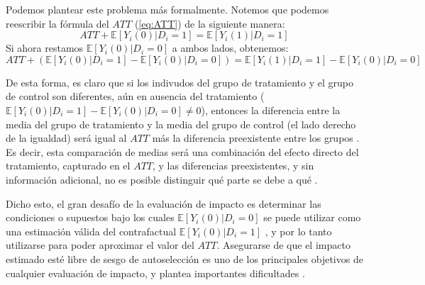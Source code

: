 \documentclass[../../main.tex]{subfiles}
\begin{document}
Podemos plantear este problema más formalmente. Notemos que podemos reescribir la fórmula
del \(ATT\) (\ref{eq:ATT}) de la siguiente manera:
\begin{equation}
    ATT + \mathbb{E} \left[Y_i(0)|D_i=1\right] = \mathbb{E} \left[Y_i(1)|D_i=1\right]
    \label{eq:ATT2}
\end{equation}
Si ahora restamos \(\mathbb{E} \left[Y_i(0)|D_i=0\right]\) a ambos lados, obtenemos:
\begin{equation}
    ATT + \left( \mathbb{E} \left[Y_i(0)|D_i=1\right] - \mathbb{E} \left[Y_i(0)|D_i=0\right] \right) =
    \mathbb{E} \left[Y_i(1)|D_i=1\right] - \mathbb{E} \left[Y_i(0)|D_i=0\right]\
    \label{eq:ATT3}
\end{equation}

De esta forma, es claro que si los indivudos del grupo de tratamiento y el grupo de
control son diferentes, aún en ausencia del tratamiento (\(\mathbb{E} \left[Y_i(0)|D_i=1\right] -
\mathbb{E} \left[Y_i(0)|D_i=0\right] \neq 0\)), entonces la diferencia entre la media del
grupo de tratamiento y la media del grupo de control (el lado derecho de la igualdad) será
igual al \(ATT\) más la diferencia preexistente entre los grupos \cite{bernal}. Es decir,
esta comparación de medias será una combinación del efecto directo del tratamiento,
capturado en el \(ATT\), y las diferencias preexistentes, y sin información adicional,
no es posible distinguir qué parte se debe a qué \cite{bernal}.

Dicho esto, el gran desafío de la evaluación de impacto es determinar las condiciones o
supuestos bajo los cuales \(\mathbb{E} \left[Y_i(0)|D_i=0\right]\) se puede utilizar como
una estimación válida del contrafactual \(\mathbb{E} \left[Y_i(0)|D_i=1\right]\)
\cite{bernal}, y por lo tanto utilizarse para poder aproximar el valor del \(ATT\).
Asegurarse de que el impacto estimado esté libre de sesgo de autoselección es uno de los
principales objetivos de cualquier evaluación de impacto, y plantea importantes
dificultades \cite{gertler-2016}.
\end{document}
